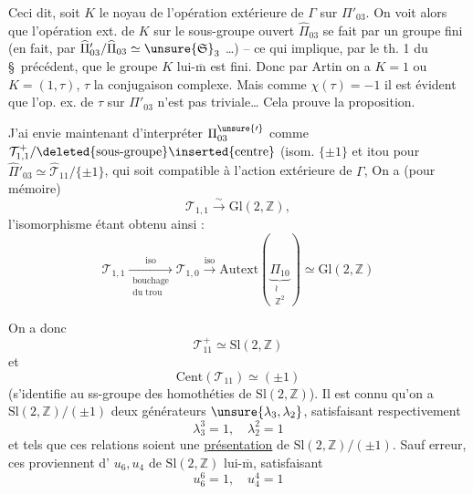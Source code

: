 
Ceci dit, soit $K$ le noyau de l'opération extérieure de $\Gamma$ sur $\Pi'_{03}$. On voit alors que  l'opération ext. de $K$ sur le sous-groupe ouvert $\widehat{\Pi}_{03}$ se fait par un groupe fini (en fait, par  $\widehat{\Pi}'_{03}/\widehat{\Pi}_{03}\simeq\unsure{\mathfrak S}_3$ \ldots) -- ce qui implique, par le th. 1 du \S\ précédent, que le groupe $K$ lui-$\overline{\mathrm m}$ est fini. Donc par Artin on a $K=1$ ou $K=(1,\tau)$, $\tau$ la conjugaison complexe. Mais comme $\chi(\tau)=-1$ il est évident que l'op. ex. de $\tau$ sur $\Pi'_{03}$  n'est pas triviale\ldots
{}
 Cela prouve la proposition.


J'ai envie maintenant d'interpréter $\Pi_{03}^{\unsure{\prime}}$ comme $\mathcal T^+_{1,1}/\deleted{\text{sous-groupe}}\inserted{\text{centre}}$ (isom.  $\{\pm1\}$\unsure{),|,} et itou pour $\widehat{\Pi}'_{03}\simeq\widehat{\mathcal T}_{11}/\{\pm1\}$,  qui soit compatible à l'action extérieure de $\Gamma$, On a (pour mémoire)
\[
\tag{10}
\mathcal T_{1,1}\xrightarrow{\sim}\mathrm{Gl}(2,\mathbb Z),
\]
l'isomorphisme étant obtenu ainsi :
\[
\tag{11}
\mathcal T_{1,1}\xrightarrow[\substack{\text{bouchage}\\\text{du trou}}]{\mathrm{iso}}\mathcal T_{1,0}\xrightarrow{\mathrm{iso}}\mathrm{Autext}\left(\underbrace{\Pi_{10}}_{\substack{\wr\\\mathbb Z^2}}\right)\simeq\mathrm{Gl}(2,\mathbb Z)
\]

On a donc
\[
\tag{12}
\mathcal T^+_{11}\simeq\mathrm{Sl}(2,\mathbb Z)
\]
et
\[
\tag{13}
\mathrm{Cent}(\mathcal T_{11})\simeq(\pm1)
\]
(s'identifie au ss-groupe des homothéties de $\mathrm{Sl}(2,\mathbb Z)$). Il est connu qu'on a  $\mathrm{Sl}(2,\mathbb Z)/(\pm1)$ deux générateurs $\unsure{\lambda_3,\lambda_2}$, satisfaisant respectivement
\[
\tag{14}
\lambda_3^3=1,\quad\lambda_2^2=1
\]
et tels que ces relations soient une \uline{présentation} de $\mathrm{Sl}(2,\mathbb Z)/(\pm1)$. Sauf erreur, ces  proviennent d' $u_6,u_4$ de $\mathrm{Sl}(2,\mathbb Z)$ lui-$\overline{\mathrm m}$, satisfaisant
\[
\tag{15}
u_6^6=1,\quad u_4^4=1
\]

